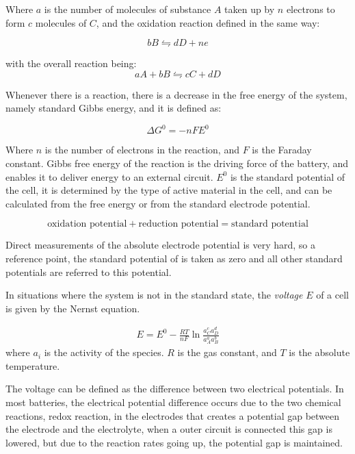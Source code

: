 	Where $a$ is the number of molecules of substance $A$ taken up by $n$ electrons to form $c$  molecules of $C$, and the oxidation reaction defined in the same way:
	
	$$bB \leftrightharpoons dD + ne $$ 
	
	with the overall reaction being: 
	\begin{equation}
	aA + bB \leftrightharpoons cC+ dD
	\label{eq:redox}
	\end{equation}
	
	Whenever there is a reaction, there is a decrease in the free energy of the system, namely standard Gibbs energy, and it is defined as:  
	
	$$\Delta G^0 = -nFE^0$$
	
	Where $n$ is the number of electrons in the reaction, and $F$ is the Faraday constant. Gibbs free energy of the reaction is the driving force of the battery, and enables it to deliver energy to an external circuit. $E^0$ is the standard potential of the cell, it is determined by the type of active material in the cell, and can be calculated from the free energy or from the standard electrode potential.
	
	$$\text{oxidation potential} + \text{reduction potential} = \text{standard potential}$$ 
	
	Direct measurements of the absolute electrode potential is very hard, so a reference point, the standard potential of  is taken as zero and all other standard potentials are referred to this potential. 
	
	In situations where the system is not in the standard state, the \textit{voltage} $E$ of a cell is given by the Nernst equation.
	
	\begin{align} 
	E = E^0 -\frac{RT}{nF} \ln{\frac{a^c_C a^d_D} {a^a_A a^b_B} } 
	\end{align} 	
	where $a_i$ is the activity of the species. $R$ is the gas constant, and $T$ is the absolute temperature.  
	
	The voltage can be defined as the difference between two electrical potentials. In most batteries, the electrical potential difference occurs due to the two chemical reactions, redox reaction, in the electrodes that creates a potential gap between the electrode and the electrolyte, when a outer circuit is connected this gap is lowered, but due to the reaction rates going up, the potential gap is maintained.
	
	
